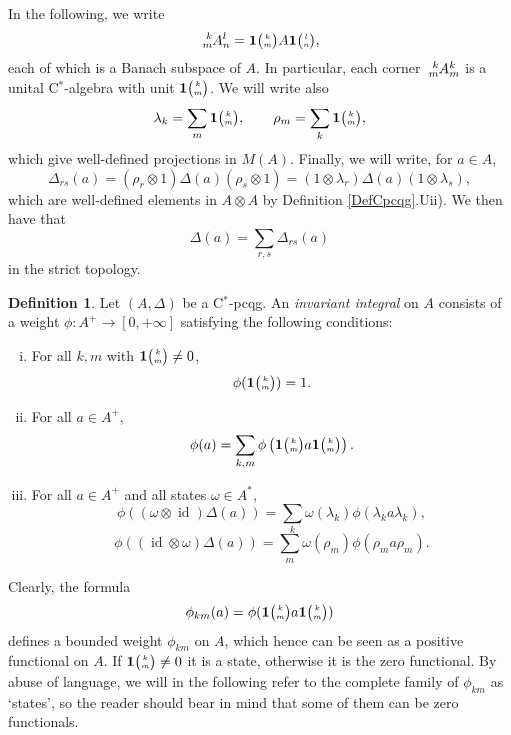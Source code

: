 \documentclass[11pt]{article}
\DeclareMathOperator{\id}{id}
\newcommand{\C}{\mathbb{C}}
\newcommand{\Grt}[3]{#1{\tiny {\begin{pmatrix} #2\\#3\end{pmatrix}}}}
\newcommand{\UnitC}[2]{\Grt{\mathbf{1}}{#1}{#2}}
\newcommand{\Gr}[5]{\,\tensor*[^{#2}_{#4}]{#1}{^{#3}_{#5}}}%
\theoremstyle{definition}
\newtheorem{Def}[Theorem]{Definition}
\numberwithin{equation}{section}
\begin{document}
In the following, we write \[\Gr{A}{k}{l}{m}{n} = \UnitC{k}{m}A\UnitC{l}{n},\] each of which is a Banach subspace of $A$. In particular, each corner $\Gr{A}{k}{k}{m}{m}$ is a unital C$^*$-algebra with unit $\UnitC{k}{m}$. We will write also \[\lambda_k = \sum_{m}\UnitC{k}{m},\qquad \rho_m = \sum_{k}\UnitC{k}{m},\] which give well-defined projections in $M(A)$. Finally, we will write, for $a\in A$, \[\Delta_{rs}(a) = (\rho_r\otimes 1)\Delta(a)(\rho_s\otimes 1) = (1\otimes \lambda_r)\Delta(a)(1\otimes \lambda_s),\] which are well-defined elements in $A\otimes A$ by Definition \ref{DefCpcqg}.Uii). We then have that  \[\Delta(a) = \sum_{r,s} \Delta_{rs}(a)\] in the strict topology. 

\begin{Def} Let $(A,\Delta)$ be a C$^*$-pcqg. An \emph{invariant integral} on $A$ consists of a weight $\phi: A^+ \rightarrow [0,+\infty]$ satisfying the following conditions:
\begin{enumerate}[i)]
\item For all $k,m$ with $\UnitC{k}{m}\neq 0$, \[\phi(\UnitC{k}{m}) = 1.\]
\item For all $a\in A^+$, \[\phi(a) = \sum_{k,m} \phi\left(\UnitC{k}{m}a\UnitC{k}{m}\right).\]
\item For all $a\in A^+$ and all states $\omega\in A^*$, \begin{equation}\label{EqInvL} \phi((\omega \otimes \id)\Delta(a)) = \sum_{k} \omega(\lambda_k)\phi(\lambda_ka\lambda_k),\end{equation} \begin{equation}\label{EqInvR} \phi((\id\otimes \omega)\Delta(a)) = \sum_{m}\omega(\rho_m)\phi(\rho_ma\rho_m).\end{equation}
\end{enumerate} 
\end{Def}





Clearly, the formula \[\phi_{km}(a) = \phi(\UnitC{k}{m}a\UnitC{k}{m})\] defines a bounded weight $\phi_{km}$ on $A$, which hence can be seen as a positive functional on $A$. If $\UnitC{k}{m}\neq 0$ it is a state, otherwise it is the zero functional. By abuse of language, we will in the following refer to the complete family of $\phi_{km}$ as `states', so the reader should bear in mind that some of them can be zero functionals.
\end{document}
